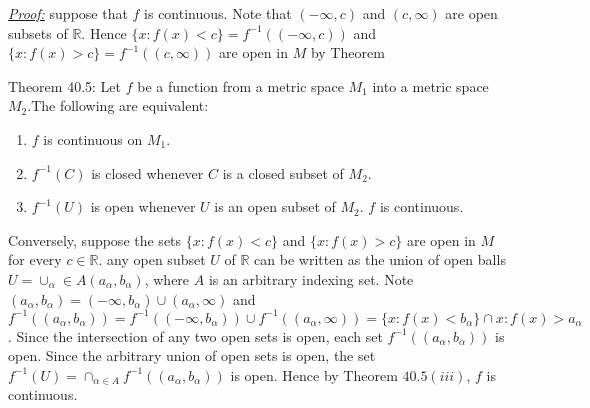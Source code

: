 \documentclass{book}
\begin{document}
\begin{tcolorbox}[enhanced,attach boxed title to top center={yshift=-3mm,yshifttext=-1mm},
colback=blue!5!white,colframe=blue!75!black,colbacktitle=red!80!black,
title=Exercise 40.15:,fonttitle=\bfseries,
boxed title style={size=small,colframe=red!50!black} ]
\textit{\color{blue}\underline{Proof:}}
suppose that $f$ is continuous. Note that $(-\infty,c)$ and $(c,\infty)$ are open subsets of $\mathbb{R}$. Hence
$\{x:f(x)<c\}=f^{-1}((-\infty,c))$ and 
$\{x:f(x)>c\}=f^{-1}((c,\infty))$ are open in $M$ by Theorem
\begin{tcolorbox}[colback=red!5!white,colframe=red!75!black]
{\color{red}Theorem 40.5:} Let $f$ be a function from a metric space $M_1$ into a metric space $M_2$.The 
following are equivalent:
\begin{enumerate}
\item $f$ is continuous on $M_1$.
\item $f^{-1}(C)$ is closed whenever $C$ is a closed subset of $M_2$.
\item $f^{-1}(U)$ is open whenever $U$ is an open subset of $M_2$.
$f$ is continuous.
\end{enumerate}
\end{tcolorbox}
Conversely, suppose the sets $\{x:f(x)<c\}$ and $\{x:f(x)>c\}$ are open in $M$ for every $c\in \mathbb{R}$. any 
open subset $U$ of $\mathbb{R}$ can
be written as the union of open balls $U=\cup_\alpha\in
A(a_\alpha,b_\alpha)$, where $A$ is an arbitrary indexing set. Note
$(a_\alpha,b_\alpha) = (-\infty,b_\alpha)\cup (a_\alpha,\infty)$ and 
$f^{-1}((a_\alpha,b_\alpha))=f^{-1}((-\infty,b_\alpha))\cup f^{-1}((a_\alpha,\infty)) 
= \{x:f(x)<b_\alpha\}\cap {x : f(x)>a_\alpha}$.
Since the intersection of any two open sets is open, each set $f^{-1}((a_\alpha,b_\alpha))$ is open. Since the 
arbitrary
union of open sets is open, the set $f^{-1}(U)=\cap_{\alpha\in A}f^{-1}((a_\alpha,b_\alpha))$ is open. Hence by 
Theorem $40.5(iii)$, $f$ is continuous.
\end{tcolorbox}
\end{document}
